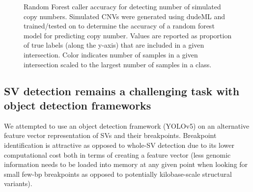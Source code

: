 \begin{figure}
    \centering
    \caption[Random Forest caller accuracy for detecting number of simulated copy numbers.]{Random Forest caller accuracy for detecting number of simulated copy numbers. Simulated CNVs were generated using dudeML and trained/tested on to determine the accuracy of a random forest model for predicting copy number. Values are reported as proportion of true labels (along the y-axis) that are included in a given intersection. Color indicates number of samples in a given intersection scaled to the largest number of samples in a class.}
    \label{fig:cnvs}
\end{figure}


\subsection{SV detection remains a challenging task with object detection frameworks}

We attempted to use an object detection framework (YOLOv5) on an alternative feature vector representation of SVs and their breakpoints. Breakpoint identification is attractive as opposed to whole-SV detection due to its lower computational cost both in terms of creating a feature vector (less genomic information needs to be loaded into memory at any given point when looking for small few-bp breakpoints as opposed to potentially kilobase-scale structural variants).


